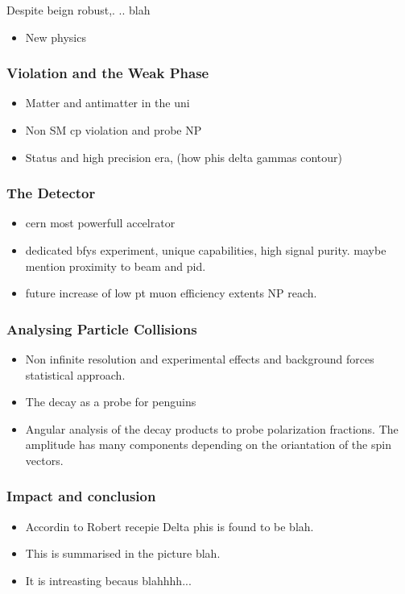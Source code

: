 Despite beign robust,. .. blah
\begin{itemize}
\item New physics
\end{itemize}


\subsubsection{\CP Violation and the Weak Phase \phis}

\begin{itemize}
\item Matter and antimatter in the uni
\item Non SM cp violation and probe NP
\item Status and high precision era, (how phis delta gammas contour)
\end{itemize}

\subsubsection{The \lhcb Detector}

\begin{itemize}
\item \lhc cern most powerfull accelrator
\item \lhcb dedicated bfys experiment, unique capabilities, high signal purity. maybe mention proximity to beam and pid.
\item future increase of low pt muon efficiency extents NP reach.
\end{itemize}

\subsubsection{Analysing Particle Collisions}

\begin{itemize}
\item Non infinite resolution and experimental effects and background forces statistical approach.
\item The \BsJpsiKst decay as a probe for penguins
\item Angular analysis of the decay products to probe polarization fractions. The amplitude has many
      components depending on the oriantation of the spin vectors.
\end{itemize}

\subsubsection{Impact and conclusion}

\begin{itemize}
\item Accordin to Robert recepie Delta phis is found to be blah.
\item This is summarised in the picture blah.
\item It is intreasting becaus blahhhh...
\end{itemize}
